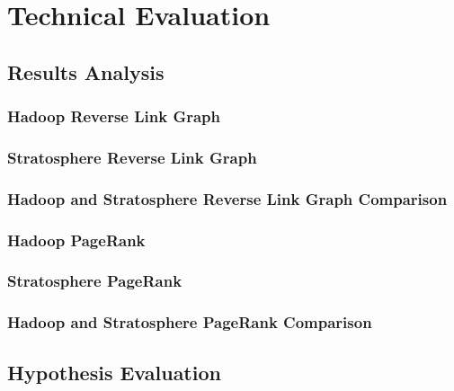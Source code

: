 \chapter{Technical Evaluation}
\section{Results Analysis}

\subsection{Hadoop Reverse Link Graph}

\subsection{Stratosphere Reverse Link Graph}

\subsection{Hadoop and Stratosphere Reverse Link Graph Comparison}

\subsection{Hadoop PageRank}

\subsection{Stratosphere PageRank}

\subsection{Hadoop and Stratosphere PageRank Comparison}

\section{Hypothesis Evaluation}
